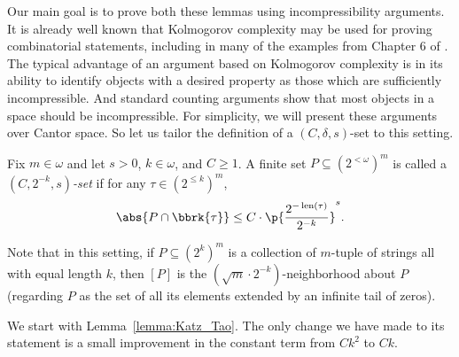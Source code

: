 Our main goal is to prove both these lemmas using incompressibility arguments. It is already well known that Kolmogorov complexity may be used for proving combinatorial statements, including in many of the examples from Chapter 6 of \cite{LV08}. The typical advantage of an argument based on Kolmogorov complexity is in its ability to identify objects with a desired property as those which are sufficiently incompressible. And standard counting arguments show that most objects in a space should be incompressible. For simplicity, we will present these arguments over Cantor space. So let us tailor the definition of a $(C, \delta, s)$-set to this setting. 

\begin{definition}
    \label{definition:C_k_s_set}
    Fix $m \in \omega$ and let $s > 0$, $k \in \omega$, and $C \geq 1$. A finite set $P \subseteq (2^{<\omega})^m$ is called a \textit{$(C, 2^{-k}, s)$-set} if for any $\tau \in (2^{\leq k})^m$,
    \begin{align*}
        \abs{P \cap \bbrk{\tau}} \leq C \cdot \p{\frac{2^{-\operatorname{len}(\tau)}}{2^{-k}}}^s.
    \end{align*}
\end{definition}

Note that in this setting, if $P \subseteq (2^k)^m$ is a collection of $m$-tuple of strings all with equal length $k$, then $[P]$ is the $(\sqrt{m} \cdot 2^{-k})$-neighborhood about $P$ (regarding $P$ as the set of all its elements extended by an infinite tail of zeros).

We start with Lemma~\ref{lemma:Katz_Tao}. The only change we have made to its statement is a small improvement in the constant term from $Ck^2$ to $Ck$.

